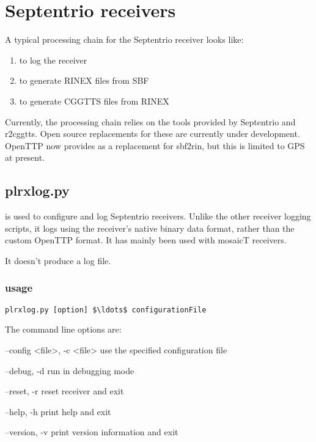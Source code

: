 \section{Septentrio receivers}

A typical processing chain for the Septentrio receiver looks like:

\begin{enumerate}
\item {}    to log the receiver
\item {} to generate RINEX files from SBF
\item {}   to generate CGGTTS files from RINEX
\end{enumerate}

Currently, the processing chain relies on the tools provided by Septentrio and r2cggtts.
Open source replacements for these are currently under development.
OpenTTP now provides  as a replacement for sbf2rin, but this is limited to GPS at present.

\subsection{plrxlog.py}
\hypertarget{h:plrxlog}{}

 is used to configure and log Septentrio receivers.
Unlike the other receiver logging scripts, it logs using the receiver's native binary data format, rather
than the custom OpenTTP format.
It has mainly been used with mosaicT receivers.

It doesn't produce a log file.

\subsubsection{usage}

\begin{lstlisting}[mathescape=true]
plrxlog.py [option] $\ldots$ configurationFile
\end{lstlisting}

The command line options are:
\begin{description*}
	\item[--config \textless{file}\textgreater, -c \textless{file}\textgreater] use the specified configuration file
	\item[--debug, -d]	run in debugging mode
	\item[--reset, -r]  reset receiver and exit
	\item[--help, -h]	print help and exit
	\item[--version, -v]	print version information and exit
\end{description*}

